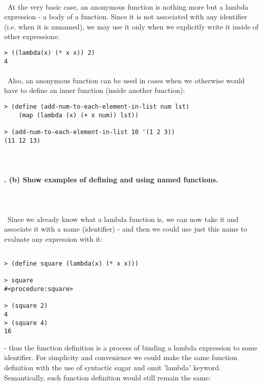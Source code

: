 \documentclass{article}
\begin{document}
\paragraph{}\
At the very basic case, an anonymous function is nothing more but a lambda expression - a body of a function. Since it is not associated with any identifier (i.e. when it is unnamed), we may use it only when we explicitly write it inside of other expressions:
\ttfamily
	
\begin{verbatim} 
> ((lambda(x) (* x x)) 2) 
4
\end{verbatim}

\rmfamily
\paragraph{}\
Also, an anonymous function can be used in cases when we otherwise would have to define an inner function (inside another function):

\begin{verbatim} 
> (define (add-num-to-each-element-in-list num lst)
    (map (lambda (x) (+ x num)) lst))
  
> (add-num-to-each-element-in-list 10 '(1 2 3))
(11 12 13)
\end{verbatim}

\paragraph{}\
\paragraph{. (b) Show examples of defining and using named functions.}\
\paragraph{}\
Since we already know what a lambda function is, we can now take it and associate it with a name (identifier) - and then we could use just this name to evaluate any expression with it:

\begin{verbatim} 
 
> (define square (lambda(x) (* x x)))

> square
#<procedure:square>

> (square 2)
4
> (square 4)
16
\end{verbatim}
- thus the function definition is a process of binding a lambda expression to some identifier. For simplicity and convenience we could make the same function definition with the use of syntactic sugar and omit 'lambda' keyword. Semantically, such function definition would still remain the same:
\end{document}
